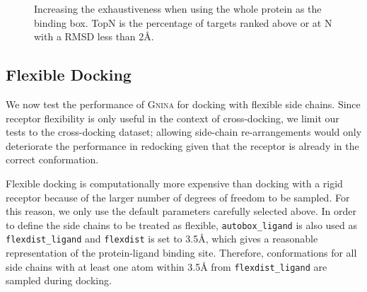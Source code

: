 \documentclass[linenumbers,doublespacing]{bmcart}
\begin{document}
\begin{figure}[tbh]   
	\caption{Increasing the exhaustiveness when using the whole protein as the binding box. TopN is the percentage of targets ranked above or at N with a RMSD less than 2{\AA}.}
        \label{fig:WholeProteinExh}
\end{figure}

\subsection{Flexible Docking}

We now test the performance of \textsc{Gnina} for docking with flexible side chains. Since receptor flexibility is only useful in the context of cross-docking, we limit our tests to the cross-docking dataset; allowing side-chain re-arrangements would only deteriorate the performance in redocking given that the receptor is already in the correct conformation.

Flexible docking is computationally more expensive than docking with a rigid receptor because of the larger number of degrees of freedom to be sampled. For this reason, we only use the default parameters carefully selected above. In order to define the side chains to be treated as flexible, \texttt{autobox\_ligand} is also used as \texttt{flexdist\_ligand} and \texttt{flexdist} is set to 3.5{\AA}, which gives a reasonable representation of the protein-ligand binding site\cite{meli2020leraning}. Therefore, conformations for all side chains with at least one atom within 3.5{\AA} from \texttt{flexdist\_ligand} are sampled during docking.
\end{document}
